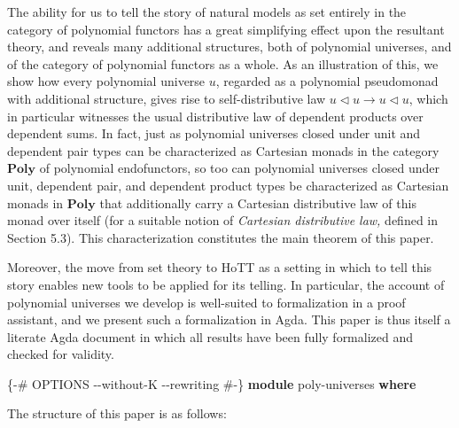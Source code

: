 \documentclass[
  11pt,
  oneside,
  article]{memoir}
\newenvironment{Shaded}{}{}
\newcommand{\KeywordTok}[1]{\textcolor[rgb]{0.00,0.44,0.13}{\textbf{#1}}}
\newcommand{\NormalTok}[1]{#1}
\newcommand{\PreprocessorTok}[1]{\textcolor[rgb]{0.74,0.48,0.00}{#1}}
\theoremstyle{definition}
\theoremstyle{plain}
\newcommand{\Cat}[1]{\mathbf{#1}}%
\newcommand{\poly}{\Cat{Poly}}
\newcommand{\0}{\textsf{0}}
\newcommand{\1}{\tn{\textsf{1}}}
\newcommand{\tri}{\mathbin{\triangleleft}}
\begin{document}
The ability for us to tell the story of natural models as set entirely
in the category of polynomial functors has a great simplifying effect
upon the resultant theory, and reveals many additional structures, both
of polynomial universes, and of the category of polynomial functors as a
whole. As an illustration of this, we show how every polynomial universe
\(u\), regarded as a polynomial pseudomonad with additional structure,
gives rise to self-distributive law \(u\tri u\to u\tri u\), which in
particular witnesses the usual distributive law of dependent products
over dependent sums. In fact, just as polynomial universes closed under
unit and dependent pair types can be characterized as Cartesian monads
in the category \(\poly\) of polynomial endofunctors, so too can
polynomial universes closed under unit, dependent pair, and dependent
product types be characterized as Cartesian monads in \(\poly\) that
additionally carry a Cartesian distributive law of this monad over
itself (for a suitable notion of \emph{Cartesian distributive law,}
defined in Section 5.3). This characterization constitutes the main
theorem of this paper.

Moreover, the move from set theory to HoTT as a setting in which to tell
this story enables new tools to be applied for its telling. In
particular, the account of polynomial universes we develop is
well-suited to formalization in a proof assistant, and we present such a
formalization in Agda. This paper is thus itself a literate Agda
document in which all results have been fully formalized and checked for
validity.

\begin{Shaded}
\begin{Highlighting}[]
\PreprocessorTok{\{{-}\# OPTIONS {-}{-}without{-}K {-}{-}rewriting \#{-}\}}
\KeywordTok{module}\NormalTok{ poly{-}universes }\KeywordTok{where}
\end{Highlighting}
\end{Shaded}

The structure of this paper is as follows:
\end{document}
